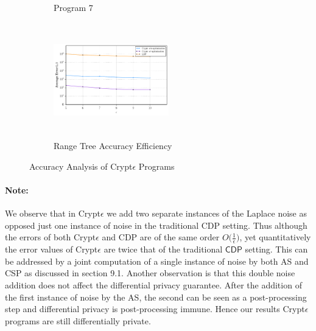 \begin{figure}
\begin{subfigure}[b]{0.3\textwidth}
        \caption{Program 7}
        \label{fig:mouse}
    \end{subfigure}
    \begin{subfigure}[b]{0.3\textwidth}
    \qquad    \includegraphics[width=5cm,height=5cm]{range.pdf}
        \caption{Range Tree Accuracy Efficiency}
        \label{fig:mouse}
    \end{subfigure}
   \caption{Accuracy Analysis of Crypt$\epsilon$ Programs}
\end{figure}




\paragraph{\textbf{Note:}} We observe that in Crypt$\epsilon$ we add two separate instances of the Laplace noise as opposed just one instance of noise in the traditional \textsf{CDP} setting. Thus although the errors of both Crypt$\epsilon$ and \textsf{CDP} are of the same order $O\big(\frac{1}{\epsilon}\big)$, yet quantitatively the error values of Crypt$\epsilon$ are twice that of the traditional $\textsf{CDP}$ setting. This can be addressed by a joint computation of a single instance of noise by both \textsf{AS} and \textsf{CSP} as discussed in section 9.1. Another observation is that this double noise addition does not affect the differential privacy guarantee. After the addition of the first instance of noise by the \textsf{AS}, the second can be seen as a post-processing step and differential privacy is post-processing immune. Hence our results Crypt$\epsilon$ programs are still differentially private.


